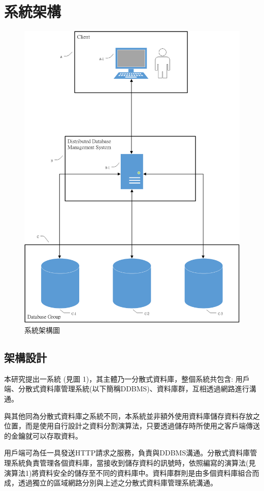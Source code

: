 \documentclass[11pt,twocolumn]{article}
\begin{document}
\section{系統架構}

\begin{figure}[h]
\centering
\includegraphics[scale=0.3]{Fig.1.png}
\caption{系統架構圖}
\end{figure}

\subsection{架構設計}
本研究提出一系統 (見圖 1)，其主體乃一分散式資料庫，整個系統共包含: 用戶端、分散式資料庫管理系統(以下簡稱DDBMS)、資料庫群，互相透過網路進行溝通。\par
與其他同為分散式資料庫之系統不同，本系統並非額外使用資料庫儲存資料存放之位置，而是使用自行設計之資料分割演算法，只要透過儲存時所使用之客戶端傳送的金鑰就可以存取資料。\par
用戶端可為任一具發送HTTP請求之服務，負責與DDBMS溝通。分散式資料庫管理系統負責管理各個資料庫，當接收到儲存資料的訊號時，依照編寫的演算法(見演算法1)將資料安全的儲存至不同的資料庫中。資料庫群則是由多個資料庫組合而成，透過獨立的區域網路分別與上述之分散式資料庫管理系統溝通。\par
\end{document}
